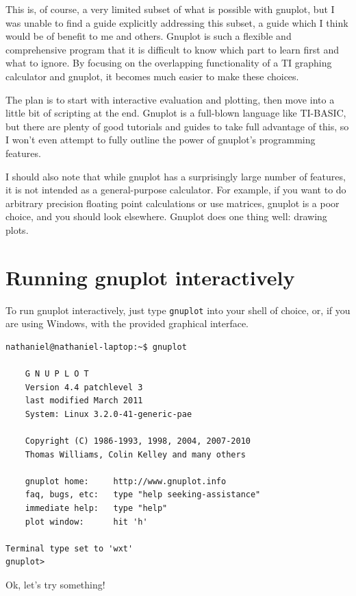 \documentclass[11pt,letterpaper]{report}
\begin{document}
This is, of course, a very limited subset of what is possible with gnuplot, but I was unable to find a guide explicitly addressing this subset, a guide which I think would be of benefit to me and others. Gnuplot is such a flexible and comprehensive program that it is difficult to know which part to learn first and what to ignore. By focusing on the overlapping functionality of a TI graphing calculator and gnuplot, it becomes much easier to make these choices.

The plan is to start with interactive evaluation and plotting, then move into a little bit of scripting at the end. Gnuplot is a full-blown language like TI-BASIC, but there are plenty of good tutorials and guides to take full advantage of this, so I won't even attempt to fully outline the power of gnuplot's programming features.

I should also note that while gnuplot has a surprisingly large number of features, it is not intended as a general-purpose calculator. For example, if you want to do arbitrary precision floating point calculations or use matrices, 
 gnuplot is a poor choice, and you should look elsewhere. Gnuplot does one thing well: drawing plots.

\section{Running gnuplot interactively}

To run gnuplot interactively, just type \verb+gnuplot+ into your shell of choice, or, if you are using Windows, with the provided graphical interface.
\begin{lstlisting}
nathaniel@nathaniel-laptop:~$ gnuplot

	G N U P L O T
	Version 4.4 patchlevel 3
	last modified March 2011
	System: Linux 3.2.0-41-generic-pae

	Copyright (C) 1986-1993, 1998, 2004, 2007-2010
	Thomas Williams, Colin Kelley and many others

	gnuplot home:     http://www.gnuplot.info
	faq, bugs, etc:   type "help seeking-assistance"
	immediate help:   type "help"
	plot window:      hit 'h'

Terminal type set to 'wxt'
gnuplot> 
\end{lstlisting}

Ok, let's try something!
\end{document}
